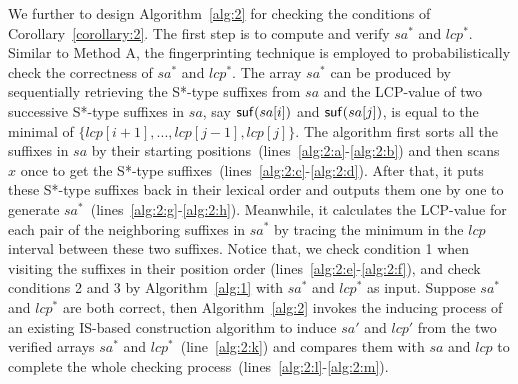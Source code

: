 \documentclass[10pt,journal,compsoc]{IEEEtran}
\begin{document}
We further to design Algorithm~\ref{alg:2} for checking the conditions of Corollary~\ref{corollary:2}. The first step is to compute and verify $sa^*$ and $lcp^*$. Similar to Method A, the fingerprinting technique is employed to probabilistically check the correctness of $sa^*$ and $lcp^*$.  The array $sa^*$ can be produced by sequentially retrieving the S*-type suffixes from $sa$ and the LCP-value of two successive S*-type suffixes in $sa$, say ${\sf suf}(sa[i])$ and ${\sf suf}(sa[j])$, is equal to the minimal of $\{lcp[i + 1], ..., lcp[j - 1], lcp[j]\}$. The algorithm first sorts all the suffixes in $sa$ by their starting positions~(lines~\ref{alg:2:a}-\ref{alg:2:b}) and then scans $x$ once to get the S*-type suffixes~(lines~\ref{alg:2:c}-\ref{alg:2:d}). After that, it puts these S*-type suffixes back in their lexical order and outputs them one by one to generate $sa^*$~(lines~\ref{alg:2:g}-\ref{alg:2:h}). Meanwhile, it calculates the LCP-value for each pair of the neighboring suffixes in $sa^*$ by tracing the minimum in the $lcp$ interval between these two suffixes. Notice that, we check condition 1 when visiting the suffixes in their position order (lines~\ref{alg:2:e}-\ref{alg:2:f}), and check conditions 2 and 3 by Algorithm~\ref{alg:1} with $sa^*$ and $lcp^*$ as input. Suppose $sa^*$ and $lcp^*$ are both correct, then Algorithm~\ref{alg:2} invokes the inducing process of an existing IS-based construction algorithm to induce $sa'$ and $lcp'$ from the two verified arrays $sa^*$ and $lcp^*$~(line~\ref{alg:2:k}) and compares them with $sa$ and $lcp$ to complete the whole checking process~(lines~\ref{alg:2:l}-\ref{alg:2:m}).
\end{document}
